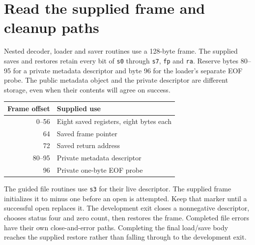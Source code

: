 \section{Read the supplied frame and cleanup paths}
Nested decoder, loader and saver routines use a 128-byte frame. The supplied saves and
restores retain every bit of \texttt{s0} through \texttt{s7}, \texttt{fp} and
\texttt{ra}. Reserve bytes 80--95 for a private metadata descriptor and byte 96 for the
loader's separate EOF probe. The public metadata object and the private descriptor are
different storage, even when their contents will agree on success.
\begin{center}
  \begin{tabular}{rl}
    Frame offset & Supplied use                            \\
    \hline
    0--56        & Eight saved registers, eight bytes each \\
    64           & Saved frame pointer                     \\
    72           & Saved return address                    \\
    80--95       & Private metadata descriptor             \\
    96           & Private one-byte EOF probe              \\
  \end{tabular}
\end{center}

The guided file routines use \texttt{s3} for their live descriptor. The supplied frame
initializes it to minus one before an open is attempted. Keep that marker until a
successful open replaces it. The development exit closes a nonnegative descriptor,
chooses status four and zero count, then restores the frame. Completed file errors
have their own close-and-error paths. Completing the final load/save body reaches the
supplied restore rather than falling through to the development exit.
